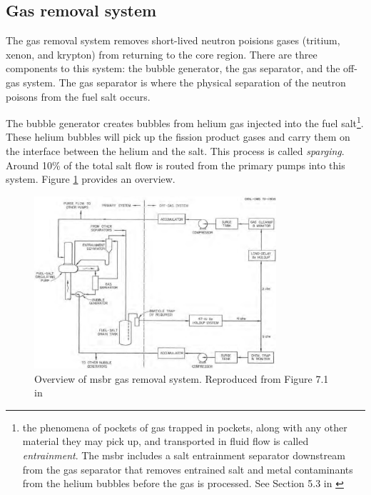 \subsection{Gas removal system}
The gas removal system removes short-lived neutron poisions gases (tritium,
xenon, and krypton) from returning to the core region. There are three
components to this system: the bubble generator, the gas separator, and the
off-gas system. The gas separator is where the physical separation of the
neutron poisons from the fuel salt occurs.

The bubble generator creates bubbles from helium gas injected into the fuel
salt\footnote{the phenomena of pockets of gas trapped in pockets, along with any
other material they may pick up, and transported in fluid flow is called {\it
entrainment}. The \Gls{msbr} includes a salt entrainment separator downstream
from the gas separator that removes entrained salt and metal contaminants from
the helium bubbles before the gas is processed. See Section 5.3 in
\cite{rosenthal_molten-salt_1968}}. These helium bubbles will pick up the
fission product gases and carry them on the interface between the helium and the
salt. This process is called {\it sparging}. Around 10\% of the total salt flow
is routed from the primary pumps into this system. Figure
\ref{fig:gas_removal_system} provides an overview.

\begin{figure}[htpb]
    \centering
    \includegraphics[width=0.8\textwidth]{figs/ch4/gas_removal_system.png}
    \caption{Overview of \Gls{msbr} gas removal system. Reproduced from Figure 7.1 in \cite{robertson_conceptual_1971}}
    \label{fig:gas_removal_system}
\end{figure}

